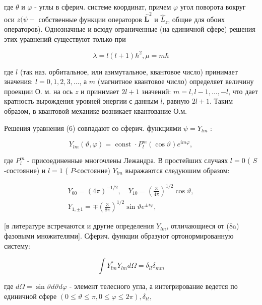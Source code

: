 \documentclass[10pt]{article}
\begin{document}
где $\theta$ и $\varphi$ - углы в сферич. системе координат, причем $\varphi$ угол поворота вокруг оси $z(\psi-$ собственные функции операторов $\hat{\boldsymbol{L}}^{2}$ и $\hat{L}_{z}$, общие для обоих операторов). Однозначные и всюду ограниченные (на единичной сфере) решения этих уравнений существуют только при



\[

\lambda=l(l+1) \hbar^{2}, \mu=m \hbar

\]



где $l$ (так наз. орбитальное, или азимутальное, квантовое число) принимает значения: $l=0,1,2,3, \ldots$, а $m$ (магнитное квантовое число) определяет величину проекции О. м. на ось $z$ и принимает $2 l+1$ значений: $m=l, l-1, \ldots,-l$, что дает кратность вырождения уровней энергии с данным $l$, равную $2 l+1$. Таким образом, в квантовой механике возникает квантование О.м.



Решения уравнения (6) совпадают со сферич. функциями $\psi=Y_{l m}$ :



\[

Y_{l m}(\vartheta, \varphi)=\text { const } \cdot P_{l}^{m}(\cos \vartheta) e^{i m \varphi},

\]



где $P_{l}^{m}$ - присоединенные многочлены Лежандра. В простейших случаях $l=0$ ( $S$-состояние) и $l=1$ ( $P$-состояние) $Y_{l m}$ выражаются следуюшим образом:



\[

\begin{gathered}

Y_{00}=(4 \pi)^{-1 / 2}, \quad Y_{10}=\left(\frac{3}{4 \pi}\right)^{1 / 2} \cos \vartheta, \\

Y_{1, \pm 1}=\mp\left(\frac{3}{8 \pi}\right)^{1 / 2} \sin \vartheta e^{ \pm i \varphi},

\end{gathered}

\]



[в литературе встречаются и другие определения $Y_{l m}$, отличающиеся от (8a) фазовыми множителями]. Сферич. функции образуют ортонормированную систему:



\[

\int Y_{l m}^{*} Y_{l m} d \Omega=\delta_{l l} \delta_{m m}

\]



где $d \Omega=\sin \vartheta d \vartheta d \varphi$ - элемент телесного угла, а интегрирование ведется по единичной сфере $(0 \leqslant \vartheta \leqslant \pi, 0 \leqslant \varphi \leqslant 2 \pi), \delta_{t t}$,
\end{document}

